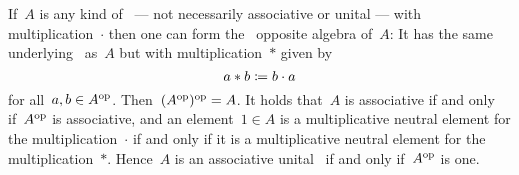 % 
% 


\begin{recall}
  If~$A$ is any kind of~{\algebra{$\kf$}} --- not necessarily associative or unital --- with multiplication~$\cdot$ then one can form the ~\gls*{opposite algebra} of~$A$:
  It has the same underlying~{\vectorspace{$\kf$}} as~$A$ but with multiplication~$*$ given by
  \[
    a * b
    \coloneqq
    b \cdot a
  \]
  for all~$a, b \in A^{\mathrm{op}}$.
  Then~$(A^{\mathrm{op}})^{\mathrm{op}} = A$.
  It holds that~$A$ is associative if and only if~$A^{\mathrm{op}}$ is associative, and an element~$1 \in A$ is a multiplicative neutral element for the multiplication~$\cdot$ if and only if it is a multiplicative neutral element for the multiplication~$*$.
  Hence~$A$ is an associative unital~{\algebra{$\kf$}} if and only if~$A^{\mathrm{op}}$ is one.
\end{recall}


